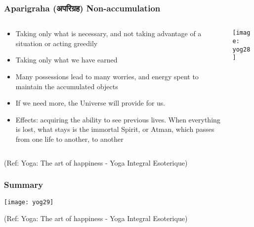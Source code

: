 \begin{frame}[fragile]\frametitle{Aparigraha (अपरिग्रह) Non-accumulation }
   \begin{columns}
    \begin{column}[t]{0.7\linewidth}
	
	\begin{itemize}
	\item Taking only what is necessary, and not taking advantage of a situation or acting greedily
	\item Taking only what we have earned
	\item Many possessions lead to many worries, and energy spent to maintain the accumulated objects
	\item If we need more, the Universe will provide for us.
	\item Effects: acquiring the ability to see previous lives.  When everything is lost, what stays is the immortal Spirit, or Atman, which passes from one life to another, to another
	\end{itemize}
	    \end{column}
    \begin{column}[t]{0.3\linewidth}
\begin{center}
\texttt{[image: yog28]}

\end{center}
    \end{column}
  \end{columns}
  
  \tiny{(Ref: Yoga: The art of happiness - Yoga Integral Esoterique)}

\end{frame}

\begin{frame}[fragile]\frametitle{Summary}

\begin{center}
\texttt{[image: yog29]}

\end{center}

  
  \tiny{(Ref: Yoga: The art of happiness - Yoga Integral Esoterique)}

\end{frame}